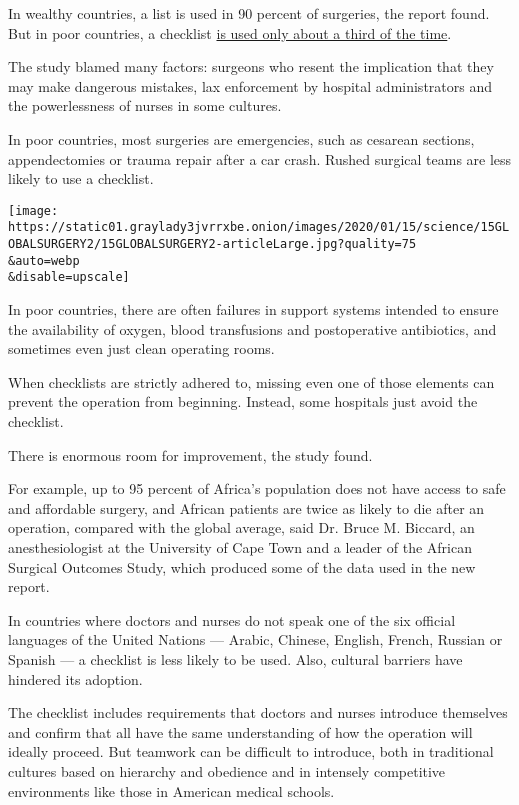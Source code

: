 In wealthy countries, a list is used in 90 percent of surgeries, the
report found. But in poor countries, a checklist
\href{https://www.lifebox.org/checkinginonthechecklist/}{is used only
about a third of the time}.

The study blamed many factors: surgeons who resent the implication that
they may make dangerous mistakes, lax enforcement by hospital
administrators and the powerlessness of nurses in some cultures.

In poor countries, most surgeries are emergencies, such as cesarean
sections, appendectomies or trauma repair after a car crash. Rushed
surgical teams are less likely to use a checklist.

\texttt{[image: https://static01.graylady3jvrrxbe.onion/images/2020/01/15/science/15GLOBALSURGERY2/15GLOBALSURGERY2-articleLarge.jpg?quality=75\\\&auto=webp\\\&disable=upscale]}

In poor countries, there are often failures in support systems intended
to ensure the availability of oxygen, blood transfusions and
postoperative antibiotics, and sometimes even just clean operating
rooms.

When checklists are strictly adhered to, missing even one of those
elements can prevent the operation from beginning. Instead, some
hospitals just avoid the checklist.

There is enormous room for improvement, the study found.

For example, up to 95 percent of Africa's population does not have
access to safe and affordable surgery, and African patients are twice as
likely to die after an operation, compared with the global average, said
Dr. Bruce M. Biccard, an anesthesiologist at the University of Cape Town
and a leader of the African Surgical Outcomes Study, which produced some
of the data used in the new report.

In countries where doctors and nurses do not speak one of the six
official languages of the United Nations --- Arabic, Chinese, English,
French, Russian or Spanish --- a checklist is less likely to be used.
Also, cultural barriers have hindered its adoption.

The checklist includes requirements that doctors and nurses introduce
themselves and confirm that all have the same understanding of how the
operation will ideally proceed. But teamwork can be difficult to
introduce, both in traditional cultures based on hierarchy and obedience
and in intensely competitive environments like those in American medical
schools.

